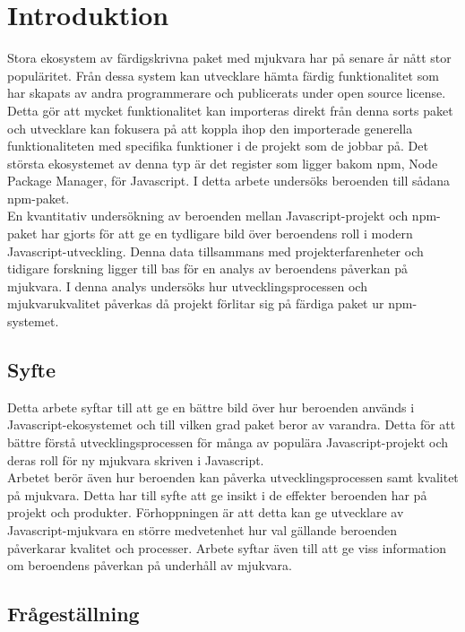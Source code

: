 \section{Introduktion}
\label{sec:joel_o-introduction}
Stora ekosystem av färdigskrivna paket med mjukvara har på senare år nått stor populäritet.\cite{Wittern:2016} Från dessa system kan utvecklare hämta färdig funktionalitet som har skapats av andra programmerare och publicerats under open source license. Detta gör att mycket funktionalitet kan importeras direkt från denna sorts paket och utvecklare kan fokusera på att koppla ihop den importerade generella funktionaliteten med specifika funktioner i de projekt som de jobbar på. Det största ekosystemet av denna typ är det register som ligger bakom npm, Node Package Manager, för Javascript.\cite{Decan2018} I detta arbete undersöks beroenden till sådana npm-paket.\\

En kvantitativ undersökning av beroenden mellan Javascript-projekt och npm-paket har gjorts för att ge en tydligare bild över beroendens roll i modern Javascript-utveckling. Denna data tillsammans med projekterfarenheter och tidigare forskning ligger till bas för en analys av beroendens påverkan på mjukvara. I denna analys undersöks hur utvecklingsprocessen och mjukvarukvalitet påverkas då projekt förlitar sig på färdiga paket ur npm-systemet.

\subsection{Syfte}
Detta arbete syftar till att ge en bättre bild över hur beroenden används i Javascript-ekosystemet och till vilken grad paket beror av varandra. Detta för att bättre förstå utvecklingsprocessen för många av populära Javascript-projekt och deras roll för ny mjukvara skriven i Javascript.\\

Arbetet berör även hur beroenden kan påverka utvecklingsprocessen samt kvalitet på mjukvara. Detta har till syfte att ge insikt i de effekter beroenden har på projekt och produkter. Förhoppningen är att detta kan ge utvecklare av Javascript-mjukvara en större medvetenhet hur val gällande beroenden påverkarar kvalitet och processer. Arbete syftar även till att ge viss information om beroendens påverkan på underhåll av mjukvara.

\subsection{Frågeställning}
\label{subsec:joel_o-research-questions}

